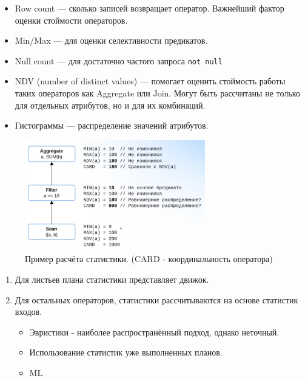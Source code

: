 \documentclass[11pt]{article}
\begin{document}
    \begin{itemize}
        \item Row count --- сколько записей возвращает оператор.
        Важнейший фактор оценки стоймости операторов.
        \item Min/Max --- для оценки селективности предикатов.
        \item Null count --- для достаточно частого запроса \texttt{not null}
        \item NDV (number of distinct values) --- помогает оценить стоймость работы таких операторов как Aggregate или Join.
        Могут быть рассчитаны не только для отдельных атрибутов, но и для их комбинаций.
        \item Гистограммы --- распределение значений атрибутов.
    \end{itemize}

    \begin{figure}[h!]
        \centering
        \includegraphics[width = 0.7\textwidth]{Pictures/Metadata/Рассчёт статистик}
        \caption{Пример расчёта статистики. (CARD - координальность оператора)}
        \label{fig:counting_statistics}
    \end{figure}

    \begin{enumerate}
        \item Для листьев плана статистики представляет движок.
        \item Для остальных операторов, статистики рассчитываются на основе статистик входов.
        \begin{itemize}
            \item Эвристики - наиболее распространённый подход, однако неточный.
            \item Использование статистик уже выполненных планов.
            \item ML
        \end{itemize}
    \end{enumerate}
\end{document}
